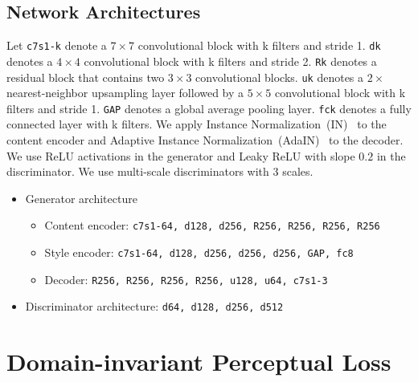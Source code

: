\documentclass[runningheads]{llncs}
\begin{document}
\subsection{Network Architectures}
	Let \texttt{c7s1-k} denote a $7\times 7$ convolutional block with k filters and stride 1. \texttt{dk} denotes a $4\times4$ convolutional block with k filters and stride 2. \texttt{Rk} denotes a residual block that contains two $3\times3$ convolutional blocks. \texttt{uk} denotes a $2\times$ nearest-neighbor upsampling layer followed by a $5 \times 5$ convolutional block with k filters and stride 1. \texttt{GAP} denotes a global average pooling layer. \texttt{fck} denotes a fully connected layer with k filters. We apply Instance Normalization~(IN)~\cite{ulyanov2017improved} to the content encoder and Adaptive Instance Normalization~(AdaIN)~\cite{huang2017adain} to the decoder. We use ReLU activations in the generator and Leaky ReLU with slope $0.2$ in the discriminator. We use multi-scale discriminators with $3$ scales.
	\begin{itemize}
		\item Generator architecture
		\begin{itemize} 
			\item Content encoder: \texttt{c7s1-64, d128, d256, R256, R256, R256, R256}
			\item Style encoder: \texttt{c7s1-64, d128, d256, d256, d256, GAP, fc8}
			\item Decoder: \texttt{R256, R256, R256, R256, u128, u64, c7s1-3}
		\end{itemize}
		\item Discriminator architecture: \texttt{d64, d128, d256, d512}
	\end{itemize}
	
	\section{Domain-invariant Perceptual Loss}
	\label{app:perceptual}
\end{document}

